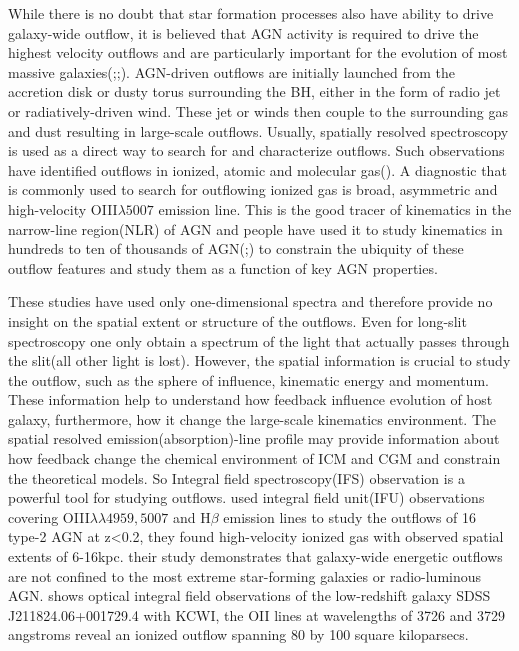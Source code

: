 \documentclass[../main.tex]{subfiles}
\begin{document}
While there is no doubt that star formation processes also have ability to drive galaxy-wide outflow, it is believed that AGN activity is required to drive the highest velocity outflows and are particularly important for the evolution of most massive galaxies(\cite{benson2003shapes};\cite{mccarthy2011gas};\cite{harrison2018agn}). AGN-driven outflows are initially launched from the accretion disk or dusty torus surrounding the BH, either in the form of radio jet or radiatively-driven wind. These jet or winds then couple to the surrounding gas and dust resulting in large-scale outflows. Usually, spatially resolved spectroscopy is used as a direct way to search for and characterize outflows. Such observations have identified outflows in ionized, atomic and molecular gas(\cite{nesvadba2008evidence}). A diagnostic that is commonly used to search for outflowing ionized gas is broad, asymmetric and high-velocity OIII$\lambda5007$ emission line. This is the good tracer of kinematics in the narrow-line region(NLR) of AGN and people have used it to study kinematics in hundreds to ten of thousands of AGN(\cite{wang2011hierarchical};\cite{mullaney2013narrow}) to constrain the ubiquity of these outflow features and study them as a function of key AGN properties. 

These studies have used only one-dimensional spectra and therefore provide no insight on the spatial extent or structure of the outflows. Even for long-slit spectroscopy one only obtain a spectrum of the light that actually passes through the slit(all other light is lost). However, the spatial information is crucial to study the outflow, such as the sphere of influence, kinematic energy and momentum. These information help to understand how feedback influence evolution of host galaxy, furthermore, how it change the large-scale kinematics environment. The spatial resolved emission(absorption)-line profile may provide information about how feedback change the chemical environment of ICM and CGM and constrain the theoretical models. So Integral field spectroscopy(IFS) observation is a powerful tool for studying outflows. \cite{harrison2014kiloparsec} used integral field unit(IFU) observations covering OIII$\lambda \lambda 4959,5007$ and H$\beta$ emission lines to study the outflows of 16 type-2 AGN at z<0.2, they found high-velocity ionized gas with observed spatial extents of 6-16kpc. their study demonstrates that galaxy-wide energetic outflows are not confined to the most extreme star-forming galaxies or radio-luminous AGN. \cite{rupke2019100} shows optical integral field observations of the low-redshift galaxy SDSS J211824.06+001729.4 with KCWI, the OII lines at wavelengths of 3726 and 3729 angstroms reveal an ionized outflow spanning 80 by 100 square kiloparsecs. 
\end{document}
